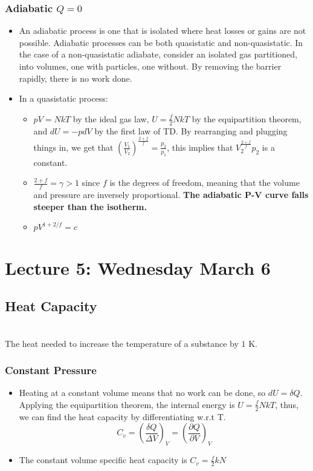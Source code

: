 \documentclass[8pt]{article}
\begin{document}
\subsubsection{Adiabatic $Q =0$}
\begin{itemize}
    \item An adiabatic process is one that is isolated where heat losses or gains are not possible. Adiabatic processes can be both quasistatic and non-quasistatic. In the case of a non-quasistatic adiabate, consider an isolated gas partitioned, into volumes, one with particles, one without. By removing the barrier rapidly, there is no work done. 
    \item In a quasistatic process:
    \begin{itemize}
        \item $pV = NkT$ by the ideal gas law, $U= \frac{f}{2}NkT$ by the equipartition theorem, and $dU = -pdV$ by the first law of TD. By rearranging and plugging things in, we get that $(\frac{V_1}{V_2})^{\frac{2+f}{f}} = \frac{p_2}{p_1}$, this implies that $V_2 ^{\frac{2+f}{f}} p_2 $ is a constant. 
        \item $\frac{2+f}{f} = \gamma >1$ since $f$ is the degrees of freedom, meaning  that the volume and pressure are inversely proportional. \textbf{The adiabatic P-V curve falls steeper than the isotherm.}
        \item $pV^{1 + 2/f} = c$
    \end{itemize}
\end{itemize}

\section{Lecture 5: Wednesday March 6}
\subsection{Heat Capacity}
\\ The heat needed to increase the temperature of a substance by $1$ K. 
\subsubsection{Constant Pressure}
\begin{itemize}
\item Heating at a constant volume means that no work can be done, so $dU = \delta Q$. Applying the equipartition theorem, the internal energy is $U = \frac{f}{2}NkT$, thus, we can find the heat capacity by differentiating w.r.t T. \begin{equation}
    C_v = \left( \frac{\delta Q}{\Delta V}\right)_{V} =  \left( \frac{\partial Q}{\partial V}\right)_{V} 
\end{equation}
    \item The constant volume specific heat capacity is $C_v = \frac{f}{2} kN$
\end{itemize}
\end{document}
